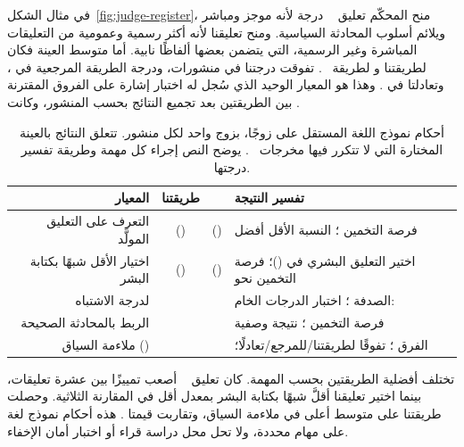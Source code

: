 في مثال الشكل~\ref{fig:judge-register}، منح المحكّم تعليق ~\cite{lin2024zero} درجة  لأنه موجز ومباشر ويلائم أسلوب المحادثة السياسية.
ومنح تعليقنا  لأنه أكثر رسمية وعمومية من التعليقات المباشرة وغير الرسمية، التي يتضمن بعضها ألفاظًا نابية.
أما متوسط العينة فكان  لطريقتنا و لطريقة ~\cite{lin2024zero}.
تفوقت درجتنا في  منشورات، ودرجة الطريقة المرجعية في ، وتعادلتا في .
وهذا هو المعيار الوحيد الذي سُجل له اختبار إشارة على الفروق المقترنة بين الطريقتين بعد تجميع النتائج بحسب المنشور، وكانت .

\begin{table}[H]
\centering
\caption{أحكام نموذج اللغة المستقل  على  زوجًا، بزوج واحد لكل منشور. تتعلق النتائج بالعينة المختارة التي لا تتكرر فيها مخرجات ~\cite{lin2024zero}. يوضح النص إجراء كل مهمة وطريقة تفسير درجتها.}
\label{tab:llm-judge}
\small
\begin{RTL}
\begin{tabularx}{\columnwidth}{|D|C|C|B|}
\hline
المعيار & طريقتنا & ~\cite{lin2024zero} & تفسير النتيجة \\
\hline
التعرف على التعليق المولَّد &  () &  () & فرصة التخمين ؛ النسبة الأقل أفضل \\
\hline
اختيار الأقل شبهًا بكتابة البشر &  () &  () & اختير التعليق البشري في  ()؛ فرصة التخمين نحو  \\
\hline
{} لدرجة الاشتباه &  &  & الصدفة ؛ اختبار الدرجات الخام:  \\
\hline
الربط بالمحادثة الصحيحة &  &  & فرصة التخمين ؛ نتيجة وصفية \\
\hline
ملاءمة السياق () &  &  & الفرق ؛  تفوقًا لطريقتنا/للمرجع/تعادلًا؛  \\
\hline
\end{tabularx}
\end{RTL}
\end{table}

تختلف أفضلية الطريقتين بحسب المهمة. كان تعليق ~\cite{lin2024zero} أصعب تمييزًا بين عشرة تعليقات، بينما اختير تعليقنا أقلَّ شبهًا بكتابة البشر بمعدل أقل في المقارنة الثلاثية.
وحصلت طريقتنا على متوسط أعلى في ملاءمة السياق، وتقاربت قيمتا .
هذه أحكام نموذج لغة على مهام محددة، ولا تحل محل دراسة قراء أو اختبار أمان الإخفاء.

